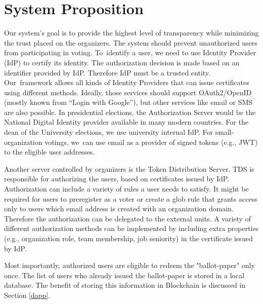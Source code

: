 \documentclass[applsci,article,accept,moreauthors,pdftex]{Definitions/mdpi}
\begin{document}
\section{System Proposition}
\label{system}
Our system's goal is to provide the highest level of transparency while minimizing the trust placed on the organizers. The system should prevent unauthorized users from participating in voting. 
To~identify a user, we need to use Identity Provider (IdP) to certify its identity. The authorization decision is made based on an identifier provided by IdP. Therefore IdP must be a trusted entity. Our~framework allows all kinds of Identity Providers that can issue certificates using different methods. Ideally, those services should support OAuth2/OpenID (mostly known from ``Login with Google''), but other services like email or SMS are also possible. 
In presidential elections, the Authorization Server would be the National Digital Identity provider available in many modern countries. For the dean of the University elections, we use university internal IdP. For small-organization votings, we~can use email as a provider of signed tokens (e.g., JWT) to the eligible user addresses. 

Another server controlled by organizers is the Token Distribution Server. TDS is responsible for authorizing the users, based on certificates issued by IdP. Authorization can include a variety of rules a user needs to satisfy. It might be required for users to preregister as a voter or create a glob rule that grants access only to users which email address is created with an organization domain. Therefore the authorization can be delegated to the external units. A variety of different authorization methods can be implemented by including extra properties (e.g., organization role, team membership, job seniority) in the certificate issued by IdP.

Most importantly, authorized users are eligible to redeem the "ballot-paper" only once. The list of users who already issued the ballot-paper is stored in a local database. The benefit of storing this information in Blockchain is discussed in Section \ref{dapp}.
\end{document}
